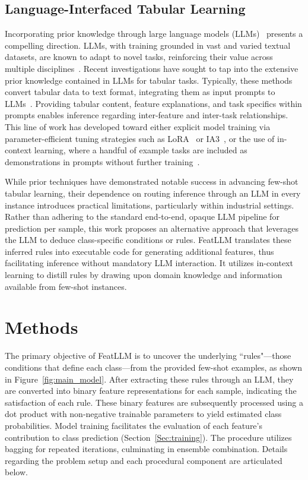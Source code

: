 \subsection{Language-Interfaced Tabular Learning} Incorporating prior knowledge through large language models (LLMs)~\cite{anil2023palm,openai2023gpt4} presents a compelling direction. LLMs, with training grounded in vast and varied textual datasets, are known to adapt to novel tasks, reinforcing their value across multiple disciplines~\cite{brown2020language}. Recent investigations have sought to tap into the extensive prior knowledge contained in LLMs for tabular tasks. Typically, these methods convert tabular data to text format, integrating them as input prompts to LLMs~\cite{dinh2022lift,hegselmann2023tabllm,wang2023anypredict}. Providing tabular content, feature explanations, and task specifics within prompts enables inference regarding inter-feature and inter-task relationships. This line of work has developed toward either explicit model training via parameter-efficient tuning strategies such as LoRA~\cite{hu2021lora} or IA3~\cite{liu2022few}, or the use of in-context learning, where a handful of example tasks are included as demonstrations in prompts without further training~\cite{dinh2022lift,hegselmann2023tabllm,nam2023semi,slack2023tablet}.

While prior techniques have demonstrated notable success in advancing few-shot tabular learning, their dependence on routing inference through an LLM in every instance introduces practical limitations, particularly within industrial settings. Rather than adhering to the standard end-to-end, opaque LLM pipeline for prediction per sample, this work proposes an alternative approach that leverages the LLM to deduce class-specific conditions or rules. \textsf{FeatLLM} translates these inferred rules into executable code for generating additional features, thus facilitating inference without mandatory LLM interaction. It utilizes in-context learning to distill rules by drawing upon domain knowledge and information available from few-shot instances.

\section{Methods}
The primary objective of \textsf{FeatLLM} is to uncover the underlying ``rules"—those conditions that define each class—from the provided few-shot examples, as shown in Figure~\ref{fig:main_model}. After extracting these rules through an LLM, they are converted into binary feature representations for each sample, indicating the satisfaction of each rule. These binary features are subsequently processed using a dot product with non-negative trainable parameters to yield estimated class probabilities. Model training facilitates the evaluation of each feature's contribution to class prediction (Section~\ref{Sec:training}). The procedure utilizes bagging for repeated iterations, culminating in ensemble combination. Details regarding the problem setup and each procedural component are articulated below.

